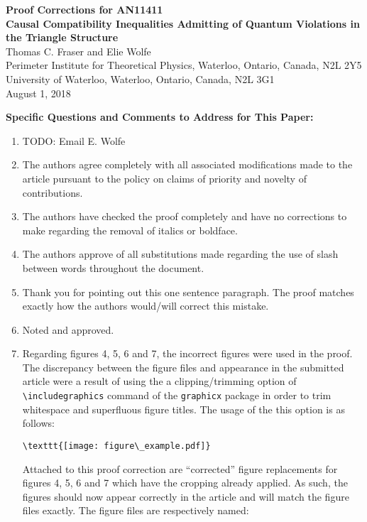 \documentclass{article}
\begin{document}
    \begin{center}
        \textbf{Proof Corrections for AN11411} \\
        \textbf{Causal Compatibility Inequalities Admitting of Quantum Violations in the Triangle Structure} \\
        Thomas C. Fraser and Elie Wolfe \\
        Perimeter Institute for Theoretical Physics, Waterloo, Ontario, Canada, N2L 2Y5 \\
        University of Waterloo, Waterloo, Ontario, Canada, N2L 3G1\\
        August 1, 2018
    \end{center}

    \textbf{Specific Questions and Comments to Address for This Paper:}
    \begin{enumerate}
        \item TODO: Email E. Wolfe
        \item The authors agree completely with all associated modifications made to the article pursuant to the policy on claims of priority and novelty of contributions.
        \item The authors have checked the proof completely and have no corrections to make regarding the removal of italics or boldface.
        \item The authors approve of all substitutions made regarding the use of slash between words throughout the document.
        \item Thank you for pointing out this one sentence paragraph. The proof matches exactly how the authors would/will correct this mistake.
        \item Noted and approved.
        \item Regarding figures 4, 5, 6 and 7, the incorrect figures were used in the proof. The discrepancy between the figure files and appearance in the submitted article were a result of using the a clipping/trimming option of \verb|\includegraphics| command of the \verb|graphicx| package in order to trim whitespace and superfluous figure titles. The usage of the this option is as follows:
        \begin{verbatim}\texttt{[image: figure\_example.pdf]}\end{verbatim}
        Attached to this proof correction are ``corrected'' figure replacements for figures 4, 5, 6 and 7 which have the cropping already applied. As such, the figures should now appear correctly in the article and will match the figure files exactly. The figure files are respectively named:

\end{enumerate}
\end{document}
